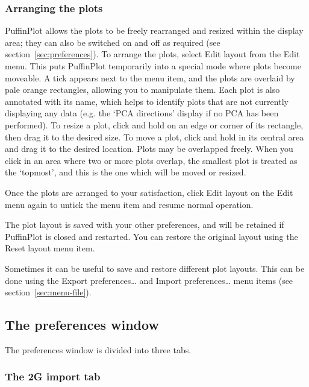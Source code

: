 \documentclass[a4paper,british]{article}
\newcommand{\ppcmd}[1]{\textsf{#1}} %
\newcommand{\caps}[1]{\MakeTextUppercase{#1}} %
\begin{document}
\subsubsection{\label{sec:edit-layout}Arranging the plots}

PuffinPlot allows the plots to be freely rearranged and resized within the
display area; they can also be switched on and off as required (see
section~\ref{sec:preferences}). To arrange the plots, select \ppcmd{Edit
  layout} from the \ppcmd{Edit} menu. This puts PuffinPlot temporarily into a
special mode where plots become moveable. A tick appears next to the menu
item, and the plots are overlaid by pale orange rectangles, allowing you to
manipulate them. Each plot is also annotated with its name, which helps to
identify plots that are not currently displaying any data (e.g. the
`\caps{pca} directions' display if no \caps{pca} has been performed). To
resize a plot, click and hold on an edge or corner of its rectangle, then
drag it to the desired size. To move a plot, click and hold in its central
area and drag it to the desired location. Plots may be overlapped freely.
When you click in an area where two or more plots overlap, the smallest plot
is treated as the `topmost', and this is the one which will be moved or
resized.

Once the plots are arranged to your satisfaction, click \ppcmd{Edit layout} on
the \ppcmd{Edit} menu again to untick the menu item and resume normal
operation.

The plot layout is saved with your other preferences, and will be retained
if PuffinPlot is closed and restarted. You can restore the original
layout using the \ppcmd{Reset layout} menu item.

Sometimes it can be useful to save and restore different plot layouts. This
can be done using the \ppcmd{Export preferences…} and \ppcmd{Import
  preferences…} menu items (see section~\ref{sec:menu-file}).

\subsection{\label{sec:preferences}The preferences window}

The preferences window is divided into three tabs.

\subsubsection{\label{sec:prefs-2g-import}The \ppcmd{2G import} tab}
\end{document}
